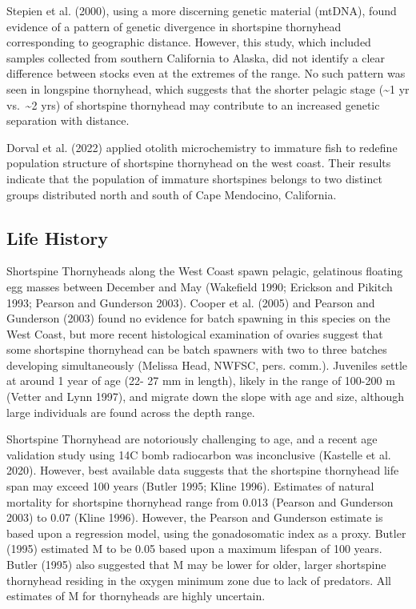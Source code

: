 \documentclass[11pt,
  english,
  letterpaper,
]{article}
\begin{document}
Stepien et al. (2000), using a more discerning genetic material (mtDNA), found evidence of a pattern of genetic divergence in shortspine thornyhead corresponding to geographic distance. However, this study, which included samples collected from southern California to Alaska, did not identify a clear difference between stocks even at the extremes of the range. No such pattern was seen in longspine thornyhead, which suggests that the shorter pelagic stage (\textasciitilde1 yr vs.~\textasciitilde2 yrs) of shortspine thornyhead may contribute to an increased genetic separation with distance.

Dorval et al. (2022) applied otolith microchemistry to immature fish to redefine population structure of shortspine thornyhead on the west coast. Their results indicate that the population of immature shortspines belongs to two distinct groups distributed north and south of Cape Mendocino, California.

\hypertarget{life-history}{%
\subsection{Life History}\label{life-history}}

Shortspine Thornyheads along the West Coast spawn pelagic, gelatinous floating egg masses between December and May (Wakefield 1990; Erickson and Pikitch 1993; Pearson and Gunderson 2003). Cooper et al. (2005) and Pearson and Gunderson (2003) found no evidence for batch spawning in this species on the West Coast, but more recent histological examination of ovaries suggest that some shortspine thornyhead can be batch spawners with two to three batches developing simultaneously (Melissa Head, NWFSC, pers. comm.). Juveniles settle at around 1 year of age (22- 27 mm in length), likely in the range of 100-200 m (Vetter and Lynn 1997), and migrate down the slope with age and size, although large individuals are found across the depth range.

Shortspine Thornyhead are notoriously challenging to age, and a recent age validation study using 14C bomb radiocarbon was inconclusive (Kastelle et al. 2020). However, best available data suggests that the shortspine thornyhead life span may exceed 100 years (Butler 1995; Kline 1996). Estimates of natural mortality for shortspine thornyhead range from 0.013 (Pearson and Gunderson 2003) to 0.07 (Kline 1996). However, the Pearson and Gunderson estimate is based upon a regression model, using the gonadosomatic index as a proxy. Butler (1995) estimated M to be 0.05 based upon a maximum lifespan of 100 years. Butler (1995) also suggested that M may be lower for older, larger shortspine thornyhead residing in the oxygen minimum zone due to lack of predators. All estimates of M for thornyheads are highly uncertain.
\end{document}
